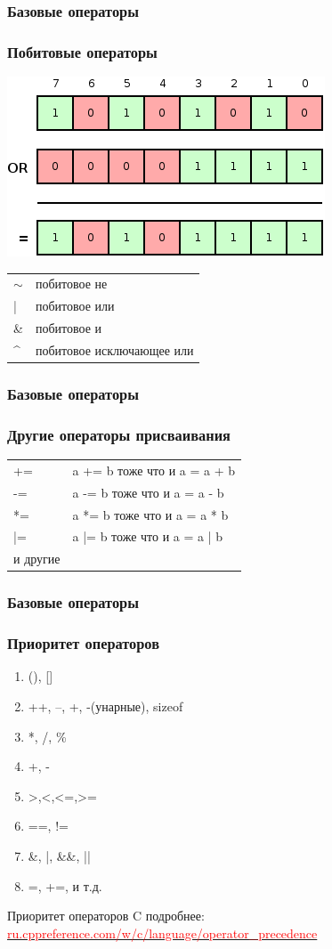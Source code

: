 \documentclass[12pt,pdf,hyperref={unicode}]{beamer}
\begin{document}
\begin{frame}
\frametitle{Базовые операторы}
\frametitle{Побитовые операторы}
\begin{center}
\includegraphics[scale=0.5]{bitwise_or.png}
\end{center}
\begin{center}
\begin{tabular}{ l l}
  $\sim$ & побитовое не \\
  | & побитовое или \\
  \& & побитовое и \\
  \^{} & побитовое исключающее или \\
\end{tabular}
\end{center}
\end{frame}

\begin{frame}
\frametitle{Базовые операторы}
\frametitle{Другие операторы присваивания}
\begin{center}
\begin{tabular}{ l l}
  += & a += b тоже что и a = a + b  \\
  -= & a -= b тоже что и a = a - b  \\
  *= & a *= b тоже что и a = a * b  \\
  |= & a |= b тоже что и a = a | b  \\
  и другие
\end{tabular}
\end{center}
\end{frame}

\begin{frame}
\frametitle{Базовые операторы}
\frametitle{Приоритет операторов}
\begin{center}
\begin{enumerate}
\item (), []
\item ++, --, +, -(унарные), sizeof
\item *, /, \%
\item +, -
\item >,<,<=,>=
\item ==, !=
\item \&, |, \&\&, ||
\item =, +=, и т.д.
\end{enumerate}
\end{center}
Приоритет операторов C подробнее:\\
\href{http://ru.cppreference.com/w/c/language/operator_precedence}
{\textcolor{red}{ru.cppreference.com/w/c/language/operator\_precedence}}
\end{frame}
\end{document}
